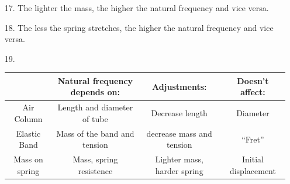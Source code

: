 \begin{itemize}
        \pagebreak

        \item [17.] The lighter the mass, the higher the natural frequency and vice versa.
        \item [18.] The less the spring stretches, the higher the natural frequency and vice versa.
        \item [19.] \mbox{}\\
        
        \begin{center}
            \begin{tabular}{c | c | c | c}
                & Natural frequency depends on: & Adjustments: & Doesn't affect: \\
                \hline
                Air Column & Length and diameter of tube & Decrease length & Diameter   \\
                \hline
                Elastic Band & Mass of the band and tension & decrease mass and tension & ``Fret''   \\
                \hline
                Mass on spring & Mass, spring resistence & Lighter mass, harder spring & Initial displacement   \\
            \end{tabular}
        \end{center}

    \end{itemize}

